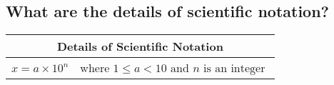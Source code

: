 \subsection{What are the details of scientific notation?}

\begin{small}
\begin{tabularx}{1\textwidth}{
        p{}
        p{}
    }
    \toprule
    \multicolumn{2}{c}{Details of Scientific Notation} \\
    \midrule

    $ x = a \times 10^n $ 
    & where $1 \leq a < 10 \text{ and } n \text{ is an integer } $
    \\
    \bottomrule

\end{tabularx}
\end{small}
